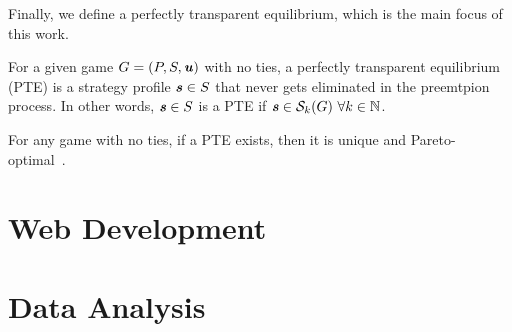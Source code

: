 Finally, we define a perfectly transparent equilibrium, which is the main focus of this work.

\begin{definition}
  For a given game $G = (P, S, \boldsymbol{\mathit{u}})$ with no ties, a perfectly transparent equilibrium (PTE) is a strategy profile $\boldsymbol{\mathit{s}} \in S$ that never gets eliminated in the preemtpion process.
  In other words, $\boldsymbol{\mathit{s}} \in S$ is a PTE if $\boldsymbol{\mathit{s}} \in \mathcal{S}_k(G)\ \forall k \in \mathbb{N}$.
\end{definition}

For any game with no ties, if a PTE exists, then it is unique and Pareto-optimal~\cite{Fourny20}.

\section{Web Development}
\section{Data Analysis}
